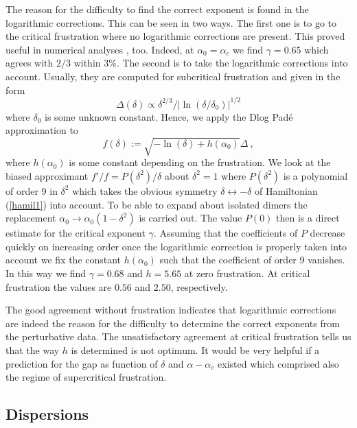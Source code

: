 The reason for the difficulty to find the correct exponent is found in
the logarithmic corrections. This can be seen in two ways.
The first one is to go to the critical frustration where no logarithmic
corrections are present. This proved useful in numerical
analyses \cite{chitr95}, too. Indeed, at $\alpha_0=\alpha_c$
we find $\gamma=0.65$ which agrees with $2/3$ within 3\%.
The second  is to take the logarithmic corrections into account. 
Usually, they are computed for subcritical
frustration and given in the form \cite{kadan80,black81,affle89}
\begin{equation}
\label{asymp1}
\Delta(\delta) \propto \delta^{2/3}/|\ln(\delta/\delta_0)|^{1/2}
\end{equation}
where $\delta_0$ is some unknown constant. Hence, we apply the
Dlog Pad\'e approximation to 
\begin{equation}
f(\delta):=\sqrt{-\ln(\delta) + h(\alpha_0)}\Delta\ ,
\end{equation}
where $h(\alpha_0)$ is some constant depending on the frustration.
We look at the biased approximant $f'/f=P(\delta^2)/\delta$ 
about $\delta^2=1$ where
$P(\delta^2)$ is a polynomial of order 9 in $\delta^2$ which takes
the obvious symmetry $\delta \leftrightarrow -\delta$
 of Hamiltonian (\ref{hamil1}) into account.
To be able to expand about isolated dimers the replacement
$\alpha_0 \to \alpha_0(1-\delta^2)$ is carried out.
 The value $P(0)$ then
is a direct estimate for the critical exponent $\gamma$. Assuming that
the coefficients of $P$ decrease quickly on increasing order once the
logarithmic correction is properly taken into account we fix
the constant $h(\alpha_0)$  such that the coefficient of order 9 vanishes.
In this way we find $\gamma=0.68$ and $h=5.65$ at zero frustration.
At critical frustration the values are $0.56$ and $2.50$, respectively.

The good agreement without frustration indicates that logarithmic
corrections are indeed the reason for the difficulty to 
determine the correct exponents from the perturbative data.
The unsatisfactory agreement at critical frustration tells us that
the way $h$ is determined is not optimum. It would be very helpful
if a  prediction for the gap as function of 
$\delta$ and $\alpha-\alpha_c$ existed which comprised also the
regime of supercritical frustration.



\subsection{Dispersions}

